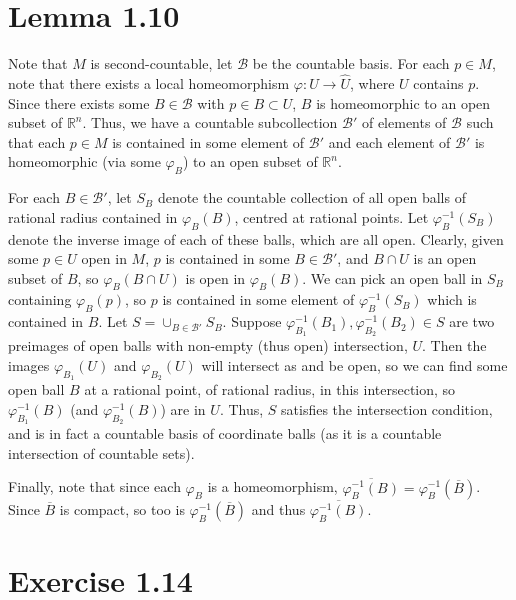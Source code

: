 \documentclass[aps,pra,showpacs,notitlepage,onecolumn,superscriptaddress,nofootinbib]{revtex4-1}
\theoremstyle{definition}
\begin{document}
\hrulefill

\section{Lemma 1.10}

\noindent
Note that $M$ is second-countable, let $\mathcal{B}$ be the countable basis. For each $p \in M$, note that there exists a local homeomorphism $\varphi : U \rightarrow \widehat{U}$, where $U$
contains $p$. Since there exists some $B \in \mathcal{B}$ with $p \in B \subset U$, $B$ is homeomorphic to an open subset of $\mathbb{R}^{n}$. Thus, we have a countable subcollection $\mathcal{B}'$ of elements of $\mathcal{B}$
such that each $p \in M$ is contained in some element of $\mathcal{B}'$ and each element of $\mathcal{B}'$ is homeomorphic (via some $\varphi_B$) to an open subset of $\mathbb{R}^{n}$.

For each $B \in \mathcal{B}'$, let $S_B$ denote the countable collection of all open balls of rational radius contained in $\varphi_B(B)$, centred at rational points. Let $\varphi_B^{-1}(S_B)$ denote the inverse image of
each of these balls, which are all open. Clearly, given some $p \in U$ open in $M$, $p$ is contained in some $B \in \mathcal{B}'$, and $B \cap U$ is an open subset of $B$, so $\varphi_B(B \cap U)$ is open in $\varphi_B(B)$.
We can pick an open ball in $S_B$ containing $\varphi_B(p)$, so $p$ is contained in some element of $\varphi_B^{-1}(S_B)$ which is contained in $B$. Let $S = \cup_{B \in \mathcal{B}'} S_B$. Suppose $\varphi_{B_1}^{-1}(B_1), \varphi_{B_2}^{-1}(B_2) \in S$ are two preimages of open balls with non-empty (thus open) intersection, $U$. Then the images $\varphi_{B_1}(U)$ and $\varphi_{B_2}(U)$ will intersect as and be open, so we can find some open ball $B$ at a rational point, of rational radius, in this intersection, so $\varphi_{B_1}^{-1}(B)$ (and $\varphi_{B_2}^{-1}(B)$) are in $U$. Thus, $S$ satisfies the intersection condition, and is in fact a countable basis of coordinate balls (as it is a countable intersection of countable sets).

Finally, note that since each $\varphi_B$ is a homeomorphism, $\overline{\varphi^{-1}_B(B)} = \varphi^{-1}_B(\overline{B})$. Since $\overline{B}$ is compact, so too is $\varphi^{-1}_B(\overline{B})$ and thus $\overline{\varphi^{-1}_B(B)}$.

\hrulefill

\section{Exercise 1.14}
\end{document}
